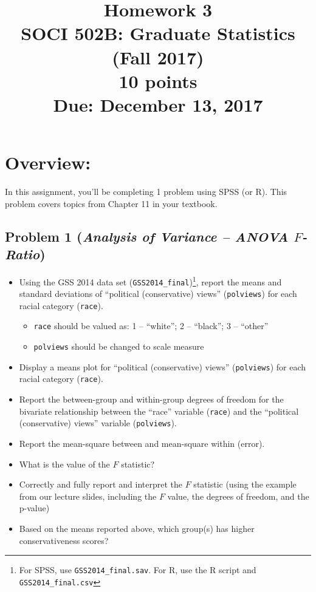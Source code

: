 \documentclass{article}
\begin{document}
\title{Homework 3\\ SOCI 502B: Graduate Statistics (Fall 2017) \\ {\large{10 points}} \\ {\large{Due: December 13, 2017}}}
\author[*]{}
\date{}
\maketitle



\section*{Overview:}
In this assignment, you'll be completing 1 problem using SPSS (or R). This problem covers topics from Chapter 11 in your textbook.

\subsection*{Problem 1 (\textit{Analysis of Variance -- ANOVA $F$-Ratio})}
\begin{itemize}
\item Using the GSS 2014 data set (\texttt{GSS2014\_final})\footnote{For SPSS, use \texttt{GSS2014\_final.sav}. For R, use the R script and \texttt{GSS2014\_final.csv}}, report the means and standard deviations of ``political (conservative) views'' (\texttt{polviews}) for each racial category (\texttt{race}).
\begin{itemize}
\item \texttt{race} should be valued as: 1 -- ``white''; 2 -- ``black''; 3 -- ``other''
\item \texttt{polviews} should be changed to scale measure
\end{itemize}
\item Display a means plot for ``political (conservative) views'' (\texttt{polviews}) for each racial category (\texttt{race}).
\item Report the between-group and within-group degrees of freedom for the bivariate relationship between the ``race'' variable (\texttt{race}) and the ``political (conservative) views'' variable (\texttt{polviews}). 
\item Report the mean-square between and mean-square within (error).
\item What is the value of the $F$ statistic? 
\item Correctly and fully report and interpret the $F$ statistic (using the example from our lecture slides, including the $F$ value, the degrees of freedom, and the p-value)
\item Based on the means reported above, which group(s) has higher conservativeness scores?
\end{itemize}
\end{document}
